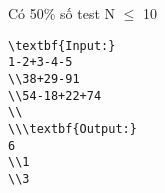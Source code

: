 Có 50\% số test N  $\le$  10
\begin{verbatim}
\textbf{Input:}
1-2+3-4-5
\\38+29-91
\\54-18+22+74
\\
\\\textbf{Output:}
6
\\1
\\3 \end{verbatim}